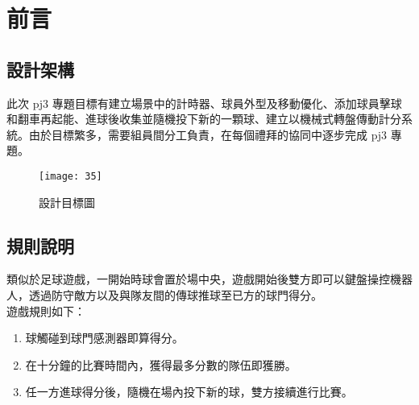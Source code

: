 \chapter{前言}
\renewcommand{\baselinestretch}{10.0} %
\setcounter{page}{1}  %
\fontsize{14pt}{2.5pt}\sectionef
\section{設計架構}
此次 pj3 專題目標有建立場景中的計時器、球員外型及移動優化、添加球員擊球和翻車再起能、進球後收集並隨機投下新的一顆球、建立以機械式轉盤傳動計分系統。由於目標繁多，需要組員間分工負責，在每個禮拜的協同中逐步完成 pj3 專題。\\

\begin{figure}[hbt!]
\begin{center}
\texttt{[image: 35]}
\caption{\Large 設計目標圖}\label{fig.35}
\end{center}
\end{figure}
\section{規則說明}\emph{}
類似於足球遊戲，一開始時球會置於場中央，遊戲開始後雙方即可以鍵盤操控機器人，透過防守敵方以及與隊友間的傳球推球至已方的球門得分。\\
遊戲規則如下：
\begin{enumerate}
\item 球觸碰到球門感測器即算得分。
\item 在十分鐘的比賽時間內，獲得最多分數的隊伍即獲勝。
\item 任一方進球得分後，隨機在場內投下新的球，雙方接續進行比賽。
\end{enumerate}

\renewcommand{\baselinestretch}{0.5} %